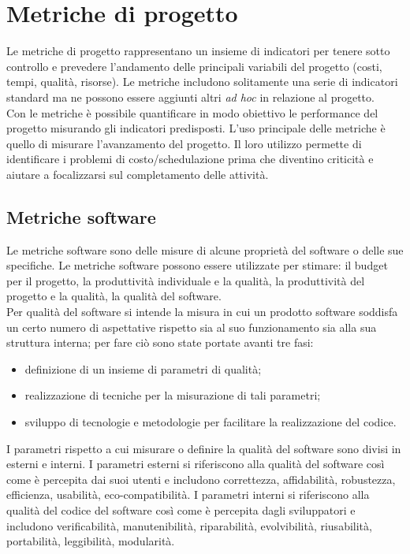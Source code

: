 \section{Metriche di progetto}
Le metriche di progetto rappresentano un insieme di indicatori per tenere sotto controllo e prevedere l'andamento delle principali variabili del progetto (costi, tempi, qualità, risorse).
Le metriche includono solitamente una serie di indicatori standard ma ne possono essere aggiunti altri \textit{ad hoc} in relazione al progetto.
\\
Con le metriche è possibile quantificare in modo obiettivo le performance del progetto misurando gli indicatori predisposti. L'uso principale delle metriche è quello di misurare l'avanzamento del progetto. Il loro utilizzo permette di identificare i problemi di costo/schedulazione prima che diventino criticità e aiutare a focalizzarsi sul completamento delle attività.

\subsection{Metriche software}
Le metriche software sono delle misure di alcune proprietà del software o delle sue specifiche.
Le metriche software possono essere utilizzate per stimare: il budget per il progetto, la produttività individuale e la qualità, la produttività del progetto e la qualità, la qualità del software.
\\
Per qualità del software si intende la misura in cui un prodotto software soddisfa un certo numero di aspettative rispetto sia al suo funzionamento sia alla sua struttura interna; per fare ciò sono state portate avanti tre fasi:
\begin{itemize}
\item definizione di un insieme di parametri di qualità;
\item realizzazione di tecniche per la misurazione di tali parametri;
\item sviluppo di tecnologie e metodologie per facilitare la realizzazione del codice.
\end{itemize}
I parametri rispetto a cui misurare o definire la qualità del software sono divisi in esterni e interni.
I parametri esterni si riferiscono alla qualità del software così come è percepita dai suoi utenti e includono correttezza, affidabilità, robustezza, efficienza, usabilità, eco-compatibilità. %
I parametri interni si riferiscono alla qualità del codice del software così come è percepita dagli sviluppatori e includono verificabilità, manutenibilità, riparabilità, evolvibilità, riusabilità, portabilità, leggibilità, modularità. %

